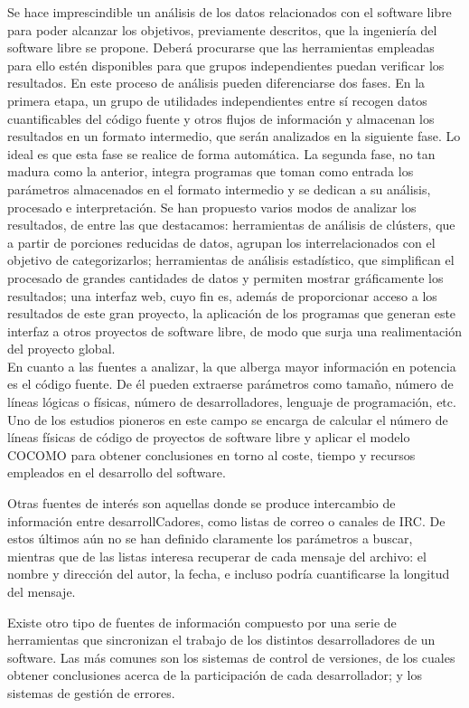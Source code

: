 Se hace imprescindible un análisis de los datos relacionados con el software
libre para poder alcanzar los objetivos, previamente descritos, que la
ingeniería del software libre se propone. Deberá procurarse que las herramientas
empleadas para ello estén disponibles para que grupos independientes puedan
verificar los resultados.
En este proceso de análisis pueden diferenciarse dos fases.
En la primera etapa, un grupo de utilidades independientes entre sí recogen
datos cuantificables del código fuente y otros flujos de información y
almacenan los resultados en un formato intermedio, que serán analizados en
la siguiente fase. Lo ideal es que esta fase se realice de forma automática.
La segunda fase, no tan madura como la anterior, integra programas que toman
como entrada los parámetros almacenados en el formato intermedio y se dedican
a su análisis, procesado e interpretación. Se han propuesto varios modos de
analizar los resultados, de entre las que destacamos:
herramientas de análisis de clústers, que a partir de porciones reducidas de
datos, agrupan los interrelacionados con el objetivo de categorizarlos;
herramientas de análisis estadístico, que simplifican el procesado de grandes
cantidades de datos y permiten mostrar gráficamente los resultados;
una interfaz web, cuyo fin es, además de proporcionar acceso a los
resultados de este gran proyecto, la aplicación de los programas que
generan este interfaz a otros proyectos de software libre, de modo que surja
una realimentación del proyecto global.
\\[0.5cm]
En cuanto a las fuentes a analizar, la que alberga mayor información
en potencia es el código fuente. De él pueden extraerse parámetros como tamaño,
número de líneas lógicas o físicas, número de desarrolladores, lenguaje de
programación, etc. Uno de los estudios pioneros en este campo se encarga de
calcular el número de líneas físicas de código de proyectos de software libre
y aplicar el modelo COCOMO para obtener conclusiones en torno al coste, tiempo
y recursos empleados en el desarrollo del software.

Otras fuentes de interés son aquellas donde se produce intercambio de
información entre desarrollCadores, como listas de correo o canales de IRC.
De estos últimos aún no se han definido claramente los parámetros a buscar,
mientras que de las listas interesa recuperar de cada mensaje del archivo:
el nombre y dirección del autor, la fecha, e incluso podría cuantificarse
la longitud del mensaje.

Existe otro tipo de fuentes de información compuesto por una serie de
herramientas que sincronizan el trabajo de los distintos desarrolladores
de un software. Las más comunes son los sistemas de control de versiones,
de los cuales obtener conclusiones acerca de la participación de cada
desarrollador; y los sistemas de gestión de errores.

